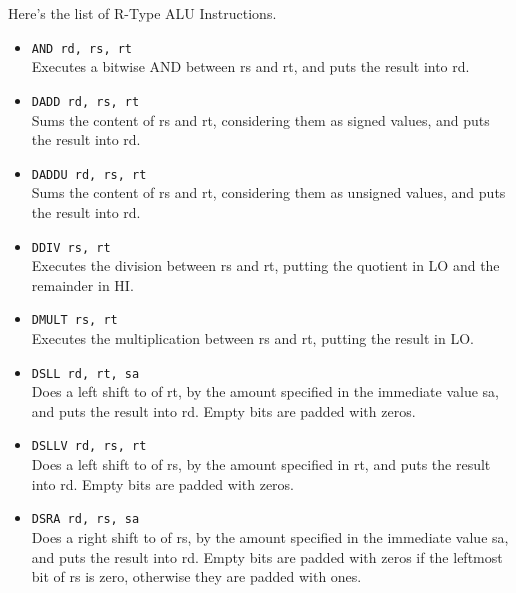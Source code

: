 \documentclass[12pt]{report}
\begin{document}
Here's the list of R-Type ALU Instructions.

\begin{itemize}
	\item \texttt{AND rd, rs, rt}\\
	Executes a bitwise AND between rs and rt, and puts the result into rd.

	\item \texttt{DADD rd, rs, rt}\\
	Sums the content of rs and rt, considering them as signed values, and puts
	the result into rd.

	\item \texttt{DADDU rd, rs, rt}\\
	Sums the content of rs and rt, considering them as unsigned values, and puts
	the result into rd.

	\item \texttt{DDIV rs, rt}\\
	Executes the division between rs and rt, putting the quotient in LO and the
	remainder in HI.

	\item \texttt{DMULT rs, rt}\\
	Executes the multiplication between rs and rt, putting the result in LO.

	\item \texttt{DSLL rd, rt, sa}\\
	Does a left shift to of rt, by the amount specified in the
	immediate value sa, and puts the result into rd. Empty bits are padded with
	zeros.

	\item \texttt{DSLLV rd, rs, rt}\\
	Does a left shift to of rs, by the amount specified in rt, and puts the
	result into rd. Empty bits are padded with zeros.

	\item \texttt{DSRA rd, rs, sa}\\
	Does a right shift to of rs, by the amount specified in the immediate value
	sa, and puts the result into rd. Empty bits are padded with zeros if the
	leftmost bit of rs is zero, otherwise they are padded with ones.


\end{itemize}
\end{document}
